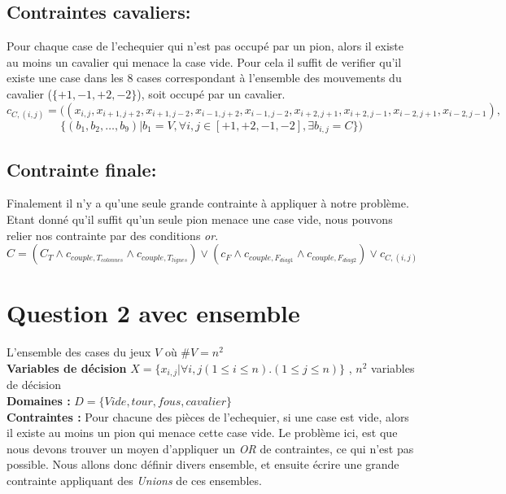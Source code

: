\documentclass[a4paper,10pt]{article}
\begin{document}
\subsection{Contraintes cavaliers:}
		Pour chaque case de l'echequier qui n'est pas occupé par un pion, alors il existe au moins un cavalier qui menace la case vide. Pour cela il suffit de verifier qu'il existe une case dans les 8 cases correspondant à l'ensemble des mouvements du cavalier ($\{+1,-1,+2,-2\}$), soit occupé par un cavalier.
$$ c_{C,(i,j)} = ((x_{i,j}, x_{i+1,j+2}, x_{i+1,j-2}, x_{i-1,j+2}, x_{i-1,j-2}, x_{i+2,j+1}, x_{i+2,j-1}, x_{i-2,j+1}, x_{i-2,j-1}),$$ $$\{(b_1, b_2, \ldots, b_9)|b_1 = V, \forall i,j \in [+1,+2,-1,-2], \exists b_{i,j} = C\}) $$

\subsection{Contrainte finale:}
	Finalement il n'y a qu'une seule grande contrainte à appliquer à notre problème. Etant donné qu'il suffit qu'un seule pion menace une case vide, nous pouvons relier nos contrainte par des conditions \emph{or}. 
$$ C = (C_T \land c_{couple,T_{colonnes}} \land c_{couple,T_{lignes}}) \lor (c_F \land c_{couple,F_{diag1}} \land c_{couple,F_{diag2}}) \lor c_{C,(i,j)}$$

\section{Question 2 avec ensemble}
L'ensemble des cases du jeux $V$ où $ \#V = n^2$ \\
\textbf {Variables de décision} $ X = \{x_{i,j} | \forall i,j (1 \leq i \leq n).(1 \leq j \leq n)\}$ , $n^2$ variables de décision \\
\textbf{Domaines : }
$ D = \{Vide, tour, fous, cavalier \} $\\
\textbf{Contraintes : } Pour chacune des pièces de l'echequier, si une case est vide, alors il existe au moins un pion qui menace cette case vide.  Le problème ici, est que nous devons trouver un moyen d'appliquer un \emph{OR} de contraintes, ce qui n'est pas possible.  Nous allons donc définir divers ensemble, et ensuite écrire une grande contrainte appliquant des \emph{Unions} de ces ensembles.
\end{document}
